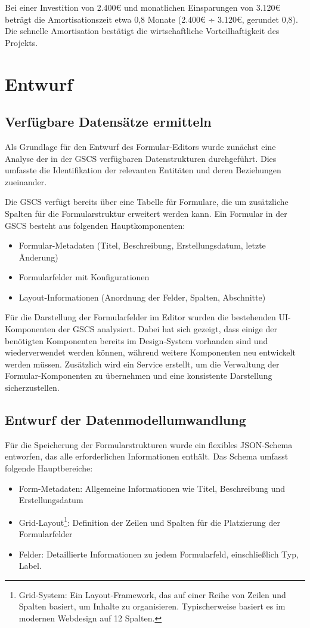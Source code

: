 \documentclass[a4paper,11pt]{article}
\begin{document}
\noindent Bei einer Investition von 2.400€ und monatlichen Einsparungen von 3.120€ beträgt die Amortisationszeit etwa 0,8 Monate (2.400€ ÷ 3.120€, gerundet 0,8). Die schnelle Amortisation bestätigt die wirtschaftliche Vorteilhaftigkeit des Projekts.

\section{Entwurf}
\subsection{Verfügbare Datensätze ermitteln}
Als Grundlage für den Entwurf des Formular-Editors wurde zunächst eine Analyse der in der GSCS verfügbaren Datenstrukturen durchgeführt. Dies umfasste die Identifikation der relevanten Entitäten und deren Beziehungen zueinander.

\noindent Die GSCS verfügt bereits über eine Tabelle für Formulare, die um zusätzliche Spalten für die Formularstruktur erweitert werden kann. Ein Formular in der GSCS besteht aus folgenden Hauptkomponenten:

\begin{itemize}
  \item Formular-Metadaten (Titel, Beschreibung, Erstellungsdatum, letzte Änderung)
  \item Formularfelder mit Konfigurationen
  \item Layout-Informationen (Anordnung der Felder, Spalten, Abschnitte)
\end{itemize}

\noindent Für die Darstellung der Formularfelder im Editor wurden die bestehenden UI-Komponenten der GSCS analysiert. Dabei hat sich gezeigt, dass einige der benötigten Komponenten bereits im Design-System vorhanden sind und wiederverwendet werden können, während weitere Komponenten neu entwickelt werden müssen. Zusätzlich wird ein Service erstellt, um die Verwaltung der Formular-Komponenten zu übernehmen und eine konsistente Darstellung sicherzustellen.

\subsection{Entwurf der Datenmodellumwandlung}
Für die Speicherung der Formularstrukturen wurde ein flexibles JSON-Schema entworfen, das alle erforderlichen Informationen enthält. Das Schema umfasst folgende Hauptbereiche:

\begin{itemize}
  \item Form-Metadaten: Allgemeine Informationen wie Titel, Beschreibung und Erstellungsdatum
  \item Grid-Layout\footnote{Grid-System: Ein Layout-Framework, das auf einer Reihe von Zeilen und Spalten basiert, um Inhalte zu organisieren. Typischerweise basiert es im modernen Webdesign auf 12 Spalten.}: Definition der Zeilen und Spalten für die Platzierung der Formularfelder
  \item Felder: Detaillierte Informationen zu jedem Formularfeld, einschließlich Typ, Label.
\end{itemize}
\end{document}
